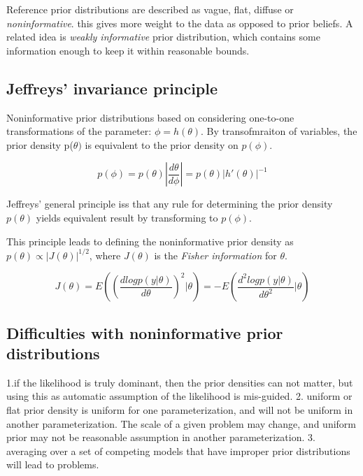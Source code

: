 \documentclass[
]{book}
\theoremstyle{definition}
\theoremstyle{definition}
\theoremstyle{definition}
\theoremstyle{definition}
\theoremstyle{remark}
\begin{document}
Reference prior distributions are described as vague, flat, diffuse or \emph{noninformative}. this gives more weight to the data as opposed to prior beliefs. A related idea is \emph{weakly informative} prior distribution, which contains some information enough to keep it within reasonable bounds.

\hypertarget{jeffreys-invariance-principle}{%
\subsection{Jeffreys' invariance principle}\label{jeffreys-invariance-principle}}

Noninformative prior distributions based on considering one-to-one transformations of the parameter: \(\phi = h(\theta)\). By transofmraiton of variables, the prior density p(\(\theta)\) is equivalent to the prior density on \(p(\phi)\).

\begin{equation}
p(\phi) = p(\theta)|\frac{d\theta}{d\phi}| = p(\theta)|h'(\theta)|^{-1}
\end{equation}

Jeffreys' general principle iss that any rule for determining the prior density \(p(\theta)\) yields equivalent result by transforming to \(p(\phi)\).

This principle leads to defining the noninformative prior density as \(p(\theta)\propto |J(\theta)|^{1/2}\), where \(J(\theta)\) is the \emph{Fisher information} for \(\theta\).

\begin{equation}
J(\theta)  = E((\frac{d log p(y|\theta)}{d\theta})^2| \theta) = -E(\frac{d^2 log p(y|\theta)}{d\theta^2} | \theta)
\end{equation}

\hypertarget{difficulties-with-noninformative-prior-distributions}{%
\subsection*{Difficulties with noninformative prior distributions}\label{difficulties-with-noninformative-prior-distributions}}

1.if the likelihood is truly dominant, then the prior densities can not matter, but using this as automatic assumption of the likelihood is mis-guided.
2. uniform or flat prior density is uniform for one parameterization, and will not be uniform in another parameterization. The scale of a given problem may change, and uniform prior may not be reasonable assumption in another parameterization.
3. averaging over a set of competing models that have improper prior distributions will lead to problems.
\end{document}
